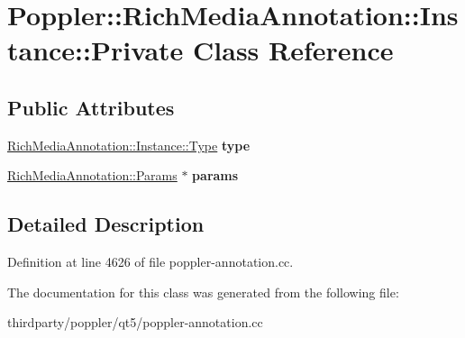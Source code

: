 \hypertarget{class_poppler_1_1_rich_media_annotation_1_1_instance_1_1_private}{}\section{Poppler\+:\+:Rich\+Media\+Annotation\+:\+:Instance\+:\+:Private Class Reference}
\label{class_poppler_1_1_rich_media_annotation_1_1_instance_1_1_private}
\subsection*{Public Attributes}
\begin{DoxyCompactItemize}
\item 
\mbox{\label{class_poppler_1_1_rich_media_annotation_1_1_instance_1_1_private_a5067b614f1475add4596abbf546073bd}} 
\hyperlink{class_poppler_1_1_rich_media_annotation_1_1_instance_ae1f530939f7bd947ac119b7315f5ec44}{Rich\+Media\+Annotation\+::\+Instance\+::\+Type} {\bfseries type}
\item 
\mbox{\label{class_poppler_1_1_rich_media_annotation_1_1_instance_1_1_private_a8803e15a227cdb281d3c2c39e3672fdb}} 
\hyperlink{class_poppler_1_1_rich_media_annotation_1_1_params}{Rich\+Media\+Annotation\+::\+Params} $\ast$ {\bfseries params}
\end{DoxyCompactItemize}


\subsection{Detailed Description}


Definition at line 4626 of file poppler-\/annotation.\+cc.



The documentation for this class was generated from the following file\+:\begin{DoxyCompactItemize}
\item 
thirdparty/poppler/qt5/poppler-\/annotation.\+cc\end{DoxyCompactItemize}
